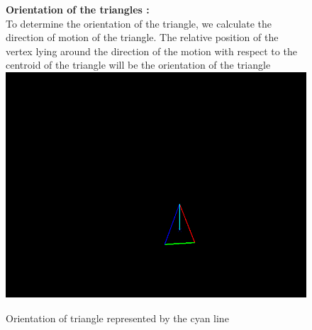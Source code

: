 \documentclass[11pt, twocolumn]{article}
\begin{document}
\begin{figure}[H]
\hspace*{10pt}
{\bf Orientation of the triangles :}\\
\hspace*{20pt}To determine the orientation of the triangle, we calculate the direction of motion of the triangle. The relative position of the vertex lying around the direction of the motion with respect to the centroid of the triangle will be the orientation of the triangle\\ 
\center
\includegraphics[scale=0.3]{orientation.png}
\caption{Orientation of triangle represented by the cyan line}
\end{figure}
\end{document}
